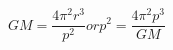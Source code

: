 \begin{equation*}
GM = \frac{4\pi^{2}r^{3}}{p^{2}} or p^{2} = \frac{4\pi^{2}p^{3}}{GM} \tag{4.9}
\end{equation*}
